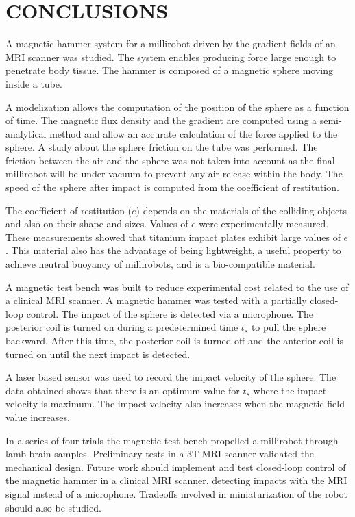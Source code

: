 \documentclass[letterpaper, 10 pt, journal, twoside]{ieeetran}
\begin{document}
\section{CONCLUSIONS}
\label{conclusion}
A magnetic hammer system for a millirobot driven by the gradient fields of an MRI scanner was studied. 
The system enables producing force large enough to penetrate body tissue.
The hammer is composed of a magnetic sphere moving inside a tube.\par
A modelization allows the computation of the position of the sphere as a function of time. 
The magnetic flux density and the gradient are computed using a semi-analytical method and allow an accurate calculation of the force applied to the sphere. A study about the sphere friction on the tube was performed. The friction between the air and the sphere was not taken into account as the final millirobot will be under vacuum to prevent any air release within the body.
The speed of the sphere after impact is computed from the coefficient of restitution. \par
The coefficient of restitution ($e$) depends on the materials of the colliding objects and also on their shape and sizes. 
Values of $e$ were experimentally measured. 
These measurements showed that titanium impact plates exhibit large values of $e$. 
This material also has the advantage of being lightweight, a useful property to achieve neutral buoyancy of millirobots, and is a bio-compatible material.\par
A magnetic test bench was built to reduce experimental cost related to the use of a clinical MRI scanner. 
A magnetic hammer was tested with a partially closed-loop control. 
The impact of the sphere is detected via a microphone. 
The posterior coil is turned on during a predetermined time $t_s$ to pull the sphere backward.
 After this time, the posterior coil is turned off and the anterior coil is turned on until the next impact is detected.\par
A laser based sensor was used to record the impact velocity of the sphere. The data obtained shows that there is an optimum value for $t_s$ where the impact velocity is maximum. The impact velocity also increases when the magnetic field value increases.\par
	In a series of four trials the magnetic test bench propelled a millirobot through lamb brain samples. Preliminary tests in a 3T MRI scanner validated the mechanical design. Future work should implement and test closed-loop control of the magnetic hammer in a clinical MRI scanner, detecting impacts with the MRI signal instead of a microphone. 
Tradeoffs involved in miniaturization of the robot should also be studied.
\vspace{-1.1em}
 
\end{document}
